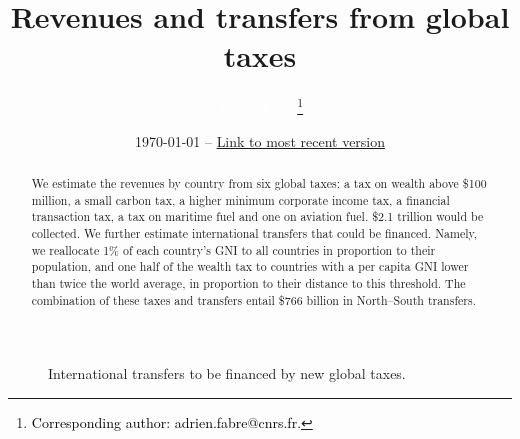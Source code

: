 \documentclass[12pt,english]{article}
\title{Revenues and transfers from global taxes %
}
\author{\textcolor{white}{Adrien Fabre\footnote{\textcolor{black}{Corresponding author: adrien.fabre@cnrs.fr.}}}
}
\date{\today{} -- \href{https://github.com/bixiou/global_tax_attitudes/raw/main/paper/policy_brief_taxes.pdf}{Link to most recent version}}
\begin{document}
\maketitle


\begin{abstract}
  We estimate the revenues by country from six global taxes: a tax on wealth above \$100 million, a small carbon tax, a higher minimum corporate income tax, %
  a financial transaction tax, a tax on maritime fuel and one on aviation fuel. \$2.1 trillion would be collected. %
  We further estimate international transfers that could be financed.  %
  Namely, we reallocate 1\% of each country's GNI to all countries in proportion to their %
  population, and one half of the wealth tax to countries with a per capita GNI lower than twice the world average, in proportion to their distance to this threshold. The combination of these taxes and transfers entail \$766 billion in North--South transfers.  
\end{abstract}

\begin{figure}[h!] 
    \caption{International transfers to be financed by new global taxes.}\label{fig:gain_both_taxes}
\end{figure}
\end{document}
